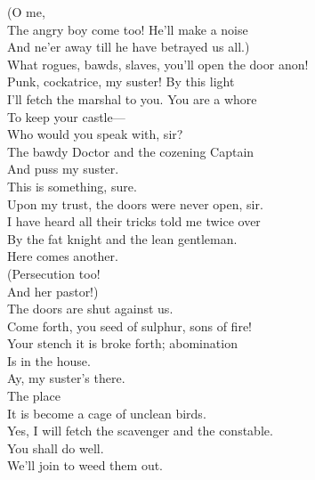\documentclass[a4paper,oneside,12pt]{memoir}
\begin{document}
\begin{drama*}
 (O me,\\
The angry boy come too! He'll make a noise\\
And ne'er away till he have betrayed us all.)\\
\kastrilspeaks What rogues, bawds, slaves, you'll open the door anon!\\
Punk, cockatrice, my suster! By this light\\
I'll fetch the marshal to you. You are a whore\\
To keep your castle---\\
\facespeaks {} Who would you speak with, sir?\\
\kastrilspeaks The bawdy Doctor and the cozening Captain\\
And puss my suster.\\
\lovewitspeaks {} This is something, sure.\\
\facespeaks Upon my trust, the doors were never open, sir.\\
\kastrilspeaks I have heard all their tricks told me twice over\\
By the fat knight and the lean gentleman.\\
\lovewitspeaks Here comes another.\\
\facespeaks {} (Persecution too!\\
And her pastor!)\\
\tribulationspeaks {} The doors are shut against us.\\
\persecutionspeaks Come forth, you seed of sulphur, sons of fire!\\
Your stench it is broke forth; abomination\\
Is in the house.\\
\kastrilspeaks {} Ay, my suster's there.\\
\persecutionspeaks {} The place\\
It is become a cage of unclean birds.\\
\kastrilspeaks Yes, I will fetch the scavenger and the constable.\\
\tribulationspeaks You shall do well.\\
\persecutionspeaks {} We'll join to weed them out.\\

\end{drama*}
\end{document}
